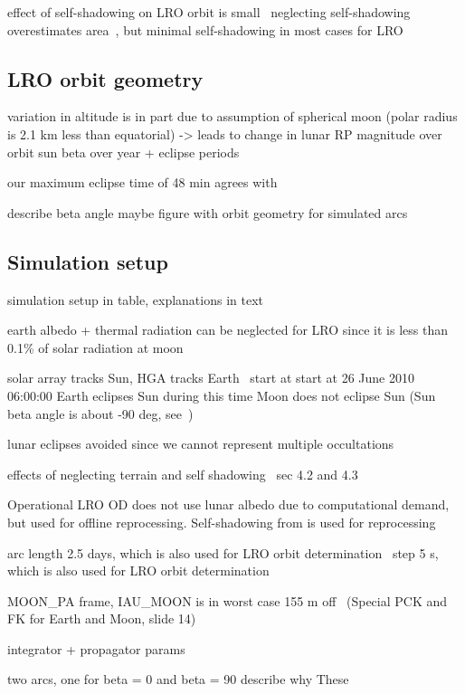 effect of self-shadowing on LRO orbit is small~\cite{Loecher2018}
neglecting self-shadowing overestimates area~\cite{Mazarico2009}, but minimal self-shadowing in most cases for LRO~\cite{Slojkowski2015}





\subsection{LRO orbit geometry}
variation in altitude is in part due to assumption of spherical moon (polar radius is 2.1 km less than equatorial) -> leads to change in lunar RP magnitude over orbit
sun beta over year + eclipse periods

our maximum eclipse time of 48 min agrees with \cite{Tooley2010}

describe beta angle
maybe figure with orbit geometry for simulated arcs


\subsection{Simulation setup}

simulation setup in table, explanations in text

earth albedo + thermal radiation can be neglected for LRO since it is less than 0.1\% of solar radiation at moon

solar array tracks Sun, HGA tracks Earth~\cite{Tooley2010}
start at start at 26 June 2010 06:00:00
Earth eclipses Sun during this time
Moon does not eclipse Sun (Sun beta angle is about -90 deg, see~\cite{Tooley2010})

lunar eclipses avoided since we cannot represent multiple occultations

effects of neglecting terrain and self shadowing~\cite{Mazarico2018} sec 4.2 and 4.3


Operational LRO OD does not use lunar albedo due to computational demand, but used for offline reprocessing.
Self-shadowing from \citeauthor{Mazarico2009} is used for reprocessing~\cite{Nicholson2010}

arc length 2.5 days, which is also used for LRO orbit determination~\cite{Mazarico2011}
step 5 s, which is also used for LRO orbit determination~\cite{Mazarico2018}

MOON\_PA frame, IAU\_MOON is in worst case 155 m off~\cite{NAIF2020} (Special PCK and FK for Earth and Moon, slide 14)

integrator + propagator params



two arcs, one for beta = 0 and beta = 90
describe why These